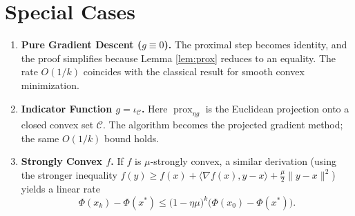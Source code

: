 \documentclass{article}
\begin{document}
\section*{Special Cases}
\begin{enumerate}[label=\textbf{S\arabic*:}]
\item \textbf{Pure Gradient Descent ($g\equiv0$).} The proximal step becomes identity, and the proof simplifies because Lemma \ref{lem:prox} reduces to an equality. The rate $O(1/k)$ coincides with the classical result for smooth convex minimization.

\item \textbf{Indicator Function $g=\iota_{\mathcal{C}}$.} Here $\operatorname{prox}_{\eta g}$ is the Euclidean projection onto a closed convex set $\mathcal{C}$. The algorithm becomes the projected gradient method; the same $O(1/k)$ bound holds.

\item \textbf{Strongly Convex $f$.} If $f$ is $\mu$‑strongly convex, a similar derivation (using the stronger inequality
$f(y)\ge f(x)+\langle\nabla f(x),y-x\rangle+\frac{\mu}{2}\|y-x\|^{2}$)
yields a linear rate
\[
\Phi(x_{k})-\Phi(x^{*})\le \bigl(1-\eta\mu\bigr)^{k}\bigl(\Phi(x_{0})-\Phi(x^{*})\bigr).
\]
\end{enumerate}
\end{document}

